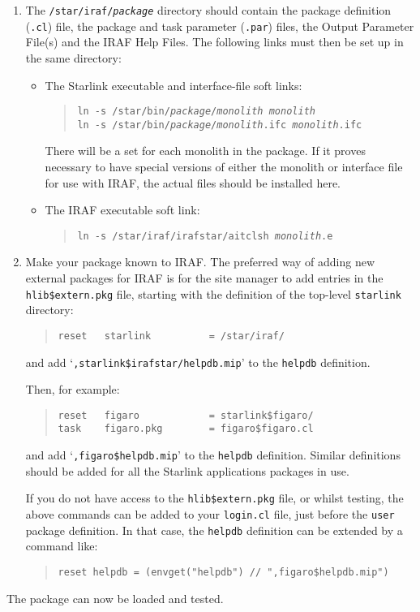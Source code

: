 \documentclass[twoside,11pt]{article}
\begin{document}
\begin{enumerate}
\item The \texttt{/star/iraf/\textit{package}} directory should contain the
package definition (\texttt{.cl}) file, the package and task parameter
(\texttt{.par}) files, the Output Parameter File(s) and the IRAF Help Files.
The following links must then be set up in the same directory:
\begin{itemize}
\item The Starlink executable and interface-file soft links:
\begin{quote}
\texttt{ln -s /star/bin/\textit{package}/\textit{monolith} \textit{monolith}\\
ln -s /star/bin/\textit{package}/\textit{monolith}.ifc \textit{monolith}.ifc}
\end{quote}
There will be a set for each monolith in the package. If it proves necessary
to have special versions of either the monolith or interface file for use with
IRAF, the actual files should be installed here.
\item The IRAF executable soft link:
\begin{quote}
\texttt{ln -s /star/iraf/irafstar/aitclsh \emph{monolith}.e}
\end{quote}
\end{itemize}

\item Make your package known to IRAF.
The preferred way of adding new external packages for IRAF is for the site
manager to add entries in the \texttt{hlib\$extern.pkg} file, starting with the
definition of the top-level \texttt{starlink} directory:
\begin{quote} \begin{verbatim}
reset   starlink          = /star/iraf/
\end{verbatim} \end{quote}
and add `\texttt{,starlink\$irafstar/helpdb.mip}' to the \texttt{helpdb}
definition.

Then, for example:
\begin{quote} \begin{verbatim}
reset   figaro            = starlink$figaro/
task    figaro.pkg        = figaro$figaro.cl
\end{verbatim} \end{quote}
and add `\texttt{,figaro\$helpdb.mip}' to the \texttt{helpdb} definition.
Similar definitions should be added for all the Starlink applications packages
in use.

If you do not have access to the \texttt{hlib\$extern.pkg} file, or whilst
testing, the above commands can be added to your \texttt{login.cl} file, just
before the \texttt{user} package definition.
In that case, the \texttt{helpdb} definition can be extended by a command like:
\begin{quote} \begin{verbatim}
reset helpdb = (envget("helpdb") // ",figaro$helpdb.mip")
\end{verbatim} \end{quote}
\end{enumerate}
The package can now be loaded and tested.
\end{document}
